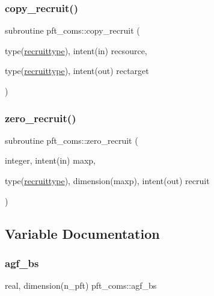 \subsubsection{\texorpdfstring{copy\+\_\+recruit()}{copy\_recruit()}}
{\footnotesize\ttfamily subroutine pft\+\_\+coms\+::copy\+\_\+recruit (\begin{DoxyParamCaption}\item[{type(\hyperlink{structpft__coms_1_1recruittype}{recruittype}), intent(in)}]{recsource,  }\item[{type(\hyperlink{structpft__coms_1_1recruittype}{recruittype}), intent(out)}]{rectarget }\end{DoxyParamCaption})}

\mbox{\label{namespacepft__coms_ab4e136720b91ff7a1087e0f0163dfacd}} 
\subsubsection{\texorpdfstring{zero\+\_\+recruit()}{zero\_recruit()}}
{\footnotesize\ttfamily subroutine pft\+\_\+coms\+::zero\+\_\+recruit (\begin{DoxyParamCaption}\item[{integer, intent(in)}]{maxp,  }\item[{type(\hyperlink{structpft__coms_1_1recruittype}{recruittype}), dimension(maxp), intent(out)}]{recruit }\end{DoxyParamCaption})}



\subsection{Variable Documentation}
\mbox{\label{namespacepft__coms_a9d509e7c71beaa9054f49d583f01f433}} 
\subsubsection{\texorpdfstring{agf\+\_\+bs}{agf\_bs}}
{\footnotesize\ttfamily real, dimension(n\+\_\+pft) pft\+\_\+coms\+::agf\+\_\+bs}

\mbox{\label{namespacepft__coms_afa924efff5f6897a77ef72109bfb8811}} 
